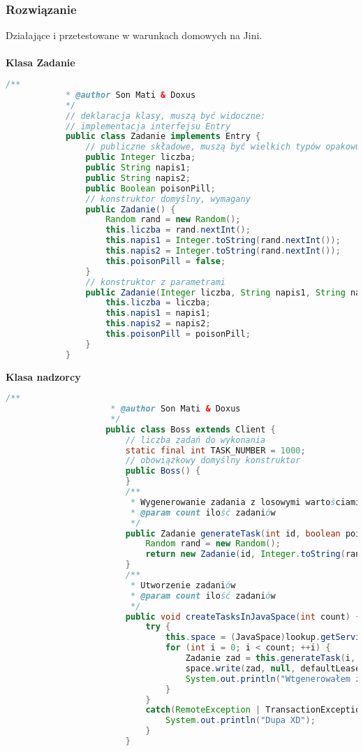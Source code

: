 		\subsubsection{Rozwiązanie}
			Działające i przetestowane w warunkach domowych na Jini.\\\\
			\textbf{Klasa Zadanie}
			\begin{lstlisting}[language=Java]
			/**
			* @author Son Mati & Doxus
			*/
			// deklaracja klasy, muszą być widoczne:
			// implementacja interfejsu Entry
			public class Zadanie implements Entry {
				// publiczne składowe, muszą być wielkich typów opakowujących
				public Integer liczba;
				public String napis1;
				public String napis2;
				public Boolean poisonPill;
				// konstruktor domyślny, wymagany
				public Zadanie() {
					Random rand = new Random();
					this.liczba = rand.nextInt();
					this.napis1 = Integer.toString(rand.nextInt());
					this.napis2 = Integer.toString(rand.nextInt());
					this.poisonPill = false;
				}
				// konstruktor z parametrami
				public Zadanie(Integer liczba, String napis1, String napis2, Boolean poisonPill) {
					this.liczba = liczba;
					this.napis1 = napis1;
					this.napis2 = napis2;
					this.poisonPill = poisonPill;
				}
			}
			\end{lstlisting}
			\newpage
			\textbf{Klasa nadzorcy}
			\begin{lstlisting}[language=Java]
					/**
					 * @author Son Mati & Doxus
					 */
					public class Boss extends Client {
						// liczba zadań do wykonania
						static final int TASK_NUMBER = 1000;
						// obowiązkowy domyślny konstruktor
						public Boss() {
						}
						/**
						 * Wygenerowanie zadania z losowymi wartościami
						 * @param count ilość zadaniów
						 */
						public Zadanie generateTask(int id, boolean poisonPill) {
							Random rand = new Random();
							return new Zadanie(id, Integer.toString(rand.nextInt(1000)), Integer.toString(rand.nextInt(1000)), poisonPill);
						}
						/**
						 * Utworzenie zadaniów
						 * @param count ilość zadaniów
						 */
						public void createTasksInJavaSpace(int count) {
							try {
								this.space = (JavaSpace)lookup.getService();
								for (int i = 0; i < count; ++i) {
									Zadanie zad = this.generateTask(i, false);
									space.write(zad, null, defaultLease);
									System.out.println("Wtgenerowałem zad " + i + " o stringach " + zad.napis1 + " i " + zad.napis2);
								}
							}
							catch(RemoteException | TransactionException ex) {
								System.out.println("Dupa XD");
							}
						}
			\end{lstlisting}
